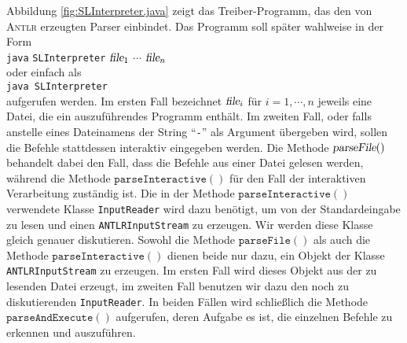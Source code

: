 Abbildung \ref{fig:SLInterpreter.java} zeigt das Treiber-Programm, das den von
\textsc{Antlr} erzeugten Parser einbindet.  Das Programm soll sp\"ater wahlweise in der Form
\\[0.2cm]
\hspace*{1.3cm}
\texttt{java} \texttt{SLInterpreter} $\textsl{file}_1$ $\cdots$ $\textsl{file}_n$
\\[0.2cm]
oder einfach als
\\[0.2cm]
\hspace*{1.3cm}
\texttt{java SLInterpreter}
\\[0.2cm]
aufgerufen werden.  Im ersten Fall  bezeichnet $\textsl{file}_i$ f\"ur $i=1,\cdots,n$
jeweils eine Datei, die ein auszuf\"uhrendes Programm enth\"alt.  Im zweiten Fall, oder
falls anstelle eines Dateinamens der String ``\texttt{-}'' als Argument \"ubergeben wird,
sollen die Befehle stattdessen interaktiv
eingegeben werden.  Die Methode $\textsl{parseFile}()$ behandelt dabei den Fall,
dass die Befehle aus einer Datei gelesen werden, w\"ahrend die Methode
$\texttt{parseInteractive}()$ f\"ur den Fall der interaktiven Verarbeitung zust\"andig ist.
Die in der Methode $\texttt{parseInteractive}()$ verwendete Klasse \texttt{InputReader} wird
dazu ben\"otigt, um von der Standardeingabe zu lesen und einen
\texttt{ANTLRInputStream} zu erzeugen.  Wir werden diese Klasse gleich genauer
diskutieren.  Sowohl die Methode $\texttt{parseFile}()$ als auch die Methode
$\texttt{parseInteractive}()$ dienen beide nur dazu, ein Objekt der Klasse
\texttt{ANTLRInputStream} zu erzeugen.  Im ersten Fall wird dieses Objekt aus der zu
lesenden Datei erzeugt, im zweiten Fall benutzen wir dazu den noch zu diskutierenden \texttt{InputReader}.
In beiden F\"allen wird schlie{\ss}lich die Methode $\texttt{parseAndExecute}()$ aufgerufen,
deren Aufgabe es ist, die einzelnen Befehle zu erkennen und auszuf\"uhren.


